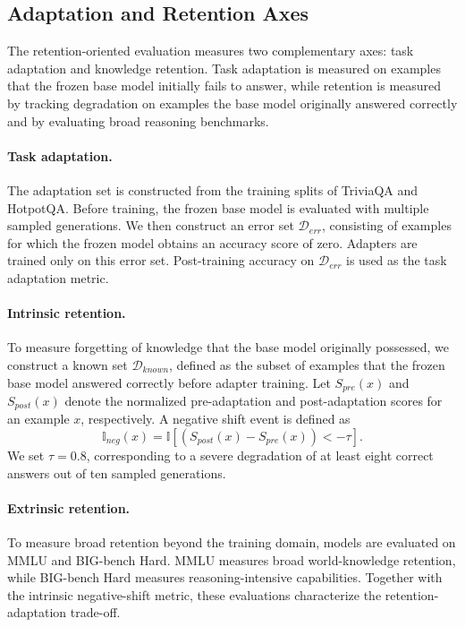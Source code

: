 \documentclass{article}
\begin{document}
\subsection{Adaptation and Retention Axes}
\label{app:adaptation_retention_axes}

The retention-oriented evaluation measures two complementary axes: task
adaptation and knowledge retention. Task adaptation is measured on examples
that the frozen base model initially fails to answer, while retention is
measured by tracking degradation on examples the base model originally answered
correctly and by evaluating broad reasoning benchmarks.

\paragraph{Task adaptation.}
The adaptation set is constructed from the training splits of TriviaQA and
HotpotQA. Before training, the frozen base model is evaluated with multiple
sampled generations. We then construct an error set
\(\mathcal{D}_{err}\), consisting of examples for which the frozen model obtains
an accuracy score of zero. Adapters are trained only on this error set.
Post-training accuracy on \(\mathcal{D}_{err}\) is used as the task adaptation
metric.

\paragraph{Intrinsic retention.}
To measure forgetting of knowledge that the base model originally possessed,
we construct a known set \(\mathcal{D}_{known}\), defined as the subset of
examples that the frozen base model answered correctly before adapter training.
Let \(S_{pre}(x)\) and \(S_{post}(x)\) denote the normalized pre-adaptation and
post-adaptation scores for an example \(x\), respectively. A negative shift
event is defined as
\[
\mathbb{I}_{neg}(x)
=
\mathbb{I}
\left[
(S_{post}(x)-S_{pre}(x)) < -\tau
\right].
\]
We set \(\tau = 0.8\), corresponding to a severe degradation of at least eight
correct answers out of ten sampled generations.

\paragraph{Extrinsic retention.}
To measure broad retention beyond the training domain, models are evaluated on
MMLU and BIG-bench Hard. MMLU measures broad world-knowledge retention, while
BIG-bench Hard measures reasoning-intensive capabilities. Together with the
intrinsic negative-shift metric, these evaluations characterize the
retention-adaptation trade-off.
\end{document}
